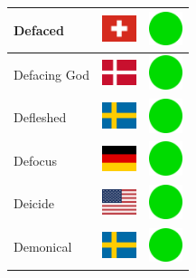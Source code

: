 \documentclass[12pt, a4paper, twoside]{report}
\begin{document}
\begin{center}
\begin{longtable}{|p{5cm}|p{2cm}|p{2cm}|}
Defaced & \includegraphics[width=1cm]{4x3/ch} & \includegraphics[width=1cm]{likes/y} \\ \hline
Defacing God & \includegraphics[width=1cm]{4x3/dk} & \includegraphics[width=1cm]{likes/y} \\ \hline
Defleshed & \includegraphics[width=1cm]{4x3/se} & \includegraphics[width=1cm]{likes/y} \\ \hline
Defocus & \includegraphics[width=1cm]{4x3/de} & \includegraphics[width=1cm]{likes/y} \\ \hline
Deicide & \includegraphics[width=1cm]{4x3/us} & \includegraphics[width=1cm]{likes/y} \\ \hline
Demonical & \includegraphics[width=1cm]{4x3/se} & \includegraphics[width=1cm]{likes/y} \\ \hline

\end{longtable}
\end{center}
\end{document}

